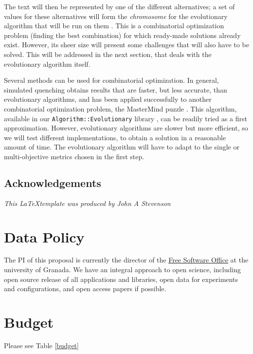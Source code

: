 \documentclass[a4paper,12pt,twocolumn]{article}
\begin{document}
The text will then be represented by one of the different
alternatives; a set of values for these alternatives will form the
{\em chromosome} for the evolutionary algorithm that will be run on
them \cite{eiben2002evolutionary}. This is a combinatorial
optimization problem (finding the best combination) for which
ready-made solutions already exist. However, its sheer size will
present some challenges that will also have to be solved. This will be
addressed in the next section, that deals with the evolutionary
algorithm itself.

Several methods can be used for combinatorial optimization. In
general, simulated quenching obtains results that are
faster, but less accurate, than evolutionary algorithms, and has been
applied successfully to another combinatorial optimization problem,
the MasterMind puzzle \cite{jj-ppsn96}. This algorithm, available in
our {\tt Algorithm::Evolutionary} library \cite{ae09}, can be readily
tried as a first approximation. However, evolutionary algorithms are
slower but more efficient, so we will test different implementations, to obtain
a solution in a reasonable amount of time. The evolutionary algorithm will have to adapt to the single or
multi-objective metrics chosen in the first step. 

\subsection{Acknowledgements}
\textit{This \LaTeX template was produced by John A Stevenson}




\section{Data Policy}

The PI of this proposal is currently the director of the
\href{http://osl.ugr.es}{Free Software Office} at the university of
Granada.  We have  an integral approach to open
science, including open source release of all applications and
libraries, open data for experiments and configurations, and open
access papers if possible.

\section{Budget}

Please see Table \ref{budget}
\end{document}
